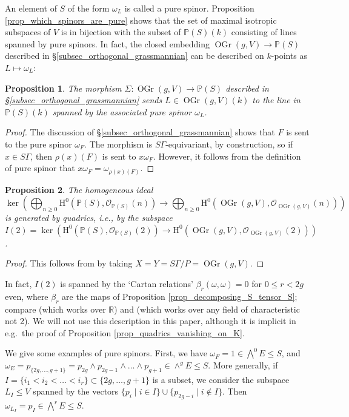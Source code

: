 \documentclass{article} %
\newtheorem{proposition}{Proposition}[section]
\numberwithin{equation}{section}
\renewcommand{\P}{\mathbb{P}}
\renewcommand{\O}{\mathcal{O}}
\newcommand{\HH}{\mathrm{H}}
\newcommand{\R}{\mathbb{R}}
\DeclareMathOperator{\OGr}{OGr}
\begin{document}
An element of $S$  of the form $\omega_L$ is called a pure spinor. Proposition \ref{prop_which_spinors_are_pure} shows that the set of maximal isotropic subspaces of $V$ is in bijection with the subset of $\P(S)(k)$ consisting of lines spanned by pure spinors. In fact, the closed embedding $\OGr(g, V) \to \P(S)$ described in \S \ref{subsec_orthogonal_grassmannian} can be described on $k$-points as $L \mapsto \omega_L$: 
\begin{proposition}
    The morphism $\Sigma : \OGr(g, V) \to \P(S)$ described in \S \ref{subsec_orthogonal_grassmannian} sends $L \in \OGr(g, V)(k)$ to the line in $\P(S)(k)$ spanned by the associated pure spinor $\omega_L$.
\end{proposition}
\begin{proof}
    The discussion of \S \ref{subsec_orthogonal_grassmannian} shows that $F$ is sent to the pure spinor $\omega_F$. The morphism is $S \Gamma$-equivariant, by construction, so if $x \in S \Gamma$, then $\rho(x)( F )$ is sent to $x \omega_F$. However, it follows from the definition of pure spinor that $x \omega_F = \omega_{\rho(x)( F )}$. 
\end{proof}


\begin{proposition}\label{prop_OG_cut_out_by_quadrics}
    The homogeneous ideal \[\ker\left(\bigoplus_{n\geq 0} \HH^0(\P(S), \O_{\P(S)}(n)) \rightarrow \bigoplus_{n\geq 0}\HH^0(\OGr(g,V), \O_{\OGr(g,V)}(n))\right)\] is generated by quadrics, i.e., by the subspace $I(2)=\ker(\HH^0(\P(S), \O_{\P(S)}(2)) \rightarrow \HH^0(\OGr(g,V), \O_{\OGr(g,V)}(2)))$.
\end{proposition}
\begin{proof}
    This follows from \cite[Theorem 3.11, Part (i)]{Ramanathan-equationsschubert} by taking $X=Y = S\Gamma/P = \OGr(g,V)$.
\end{proof}
In fact, $I(2)$ is spanned by the `Cartan relations' $\beta_r(\omega, \omega)=0$ for $0\leq r < 2g$ even, where $\beta_r$ are the maps of Proposition \ref{prop_decomposing_S_tensor_S}; compare \cite[\S 107]{Car67} (which works over $\R$) and \cite[III.4.4]{Che97} (which works over any field of characteristic not 2). We will not use this description in this paper, although it is implicit in e.g.\ the proof of Proposition \ref{prop_quadrics_vanishing_on_K}. 


We give some examples of pure spinors. First, we have $\omega_F = 1 \in \bigwedge^0 E \leq S$, and $\omega_E = p_{\{ 2g, \dots, g +1 \}} =  p_{2g}  \wedge p_{2g-1} \wedge \dots \wedge p_{g+1} \in \wedge^g E \leq S$. More generally, if $I = \{ i_1 < i_2 < \dots < i_r \} \subset \{ 2g, \dots, g+1 \}$ is a subset, we consider the subspace $L_I \leq V$ spanned by the vectors $\{ p_{i} \mid i \in I \} \cup \{ p_{2g-i} \mid i \not\in I \}$. 
Then $\omega_{L_I} = p_I \in \bigwedge^r E \leq S$. 
\end{document}
